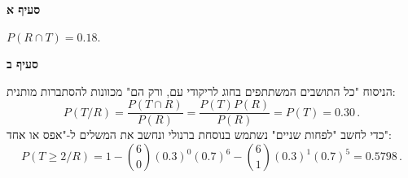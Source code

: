 \textbf{סעיף א}

$P(R\cap T)=0.18$.

\textbf{סעיף ב}

הניסוח "כל התושבים המשתתפים בחוג לריקודי עם, ורק הם" מכוונות להסתברות מותנית:
\[
P(T/R) = \frac{P(T\cap R)}{P(R)} = \frac{P(T)P(R)}{P(R)}= P(T)=0.30\,.
\]
כדי לחשב "לפחות שניים" נשתמש בנוסחת ברנולי ונחשב את המשלים ל-"אפס או אחד":
\[
P(T\geq 2/R)=1-{6\choose 0}(0.3)^0(0.7)^6 -{6\choose 1}(0.3)^1(0.7)^5=0.5798\,.
\]
